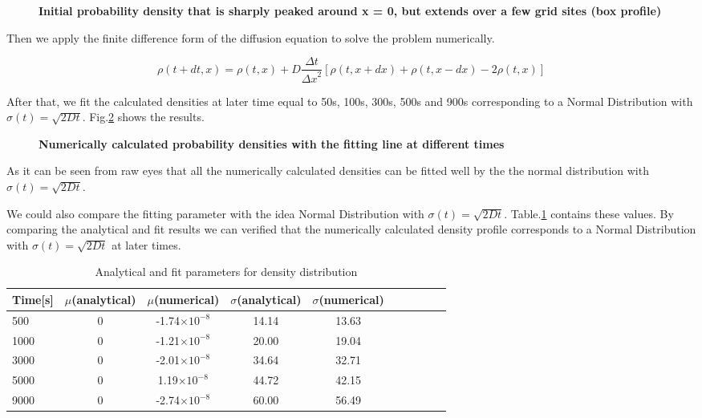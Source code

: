 \documentclass[11pt, oneside]{article}   	%
\begin{document}
\begin{figure}[htbp]
\begin{center}
\caption{{\bf  Initial probability density that is sharply peaked around x = 0, but extends over a few grid sites (box profile)}}
\label{fig1}
\end{center}
\end{figure}

Then we apply the finite difference form of the diffusion equation to solve the problem numerically.

\begin{equation*}
\rho(t+dt,x)=\rho(t,x)+D\frac{\Delta t}{{\Delta x}^2}[\rho(t,x+dx)+\rho(t,x-dx)-2\rho(t,x)]
\end{equation*}

After that, we fit the calculated densities at later time equal to 50s, 100s, 300s, 500s and 900s corresponding to a Normal Distribution with $\sigma(t)=\sqrt{2Dt}$. Fig.\ref{fig2} shows the results.

\begin{figure}[htbp]
\begin{center}
\caption{{\bf   Numerically calculated probability densities with the fitting line at different times }}
\label{fig2}
\end{center}
\end{figure}

As it can be seen from raw eyes that all the numerically calculated densities can be fitted well by the the normal distribution with $\sigma(t)=\sqrt{2Dt}$.

We could also compare the fitting parameter with the idea Normal Distribution with $\sigma(t)=\sqrt{2Dt}$. Table.\ref{table1} contains these values. By comparing the analytical and fit results we can verified that the numerically calculated density profile corresponds to a Normal Distribution with $\sigma(t)=\sqrt{2Dt}$ at later times. 

\begin{table}[htdp]
\caption{Analytical and fit parameters for density distribution}
\begin{center}
\begin{tabular}{l*{8}{c}r}
Time[s]              & $\mu$(analytical) & $\mu$(numerical)& $\sigma$(analytical) &$\sigma$(numerical)&  \\
\hline
500			&0	& -1.74$\times10^{-8}$ 	&14.14		&13.63  \\
1000			&0	&-1.21$\times10^{-8}$	&20.00		&19.04   \\
3000			&0 	& -2.01$\times10^{-8}$ 	&34.64		&32.71   \\
5000			&0 	& 1.19$\times10^{-8}$ 	&44.72		&42.15  \\
9000			&0 	& -2.74$\times10^{-8}$ 	&60.00		&56.49	\\
\end{tabular}
\end{center}
\label{table1}
\end{table}
\end{document}
